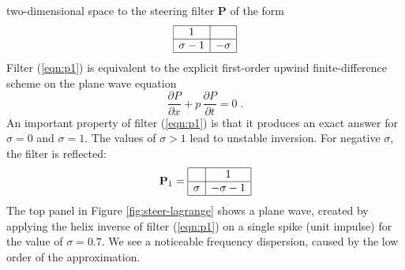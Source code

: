 two-dimensional space to the steering filter $\mathbf{P}$ of the
form
\begin{equation}
  \label{eqn:p1}
  \begin{array}{|c|c|}
    \hline
    1 & \\ \hline
    \sigma-1 & -\sigma \\ \hline
  \end{array}
\end{equation}
Filter (\ref{eqn:p1}) is equivalent to the explicit first-order upwind
finite-difference scheme on the plane wave equation
\begin{equation}
  \label{eqn:wave}
  \frac{\partial P}{\partial x} + p\,\frac{\partial P}{\partial t} = 0\;.
\end{equation}
An important property of filter (\ref{eqn:p1}) is that it produces an
exact answer for $\sigma=0$ and $\sigma=1$. The values of $\sigma > 1$
lead to unstable inversion. For negative $\sigma$, the filter is 
reflected:
\begin{equation}
  \label{eqn:p1p}
  \mathbf{P}_1 =
  \begin{array}{|c|c|}
    \hline
     & 1 \\ \hline
    \sigma & -\sigma - 1 \\ \hline
  \end{array}
\end{equation}
The top panel in Figure \ref{fig:steer-lagrange} shows a plane wave, created
by applying the helix inverse of filter (\ref{eqn:p1}) on a single
spike (unit impulse) for the value of $\sigma=0.7$. We see a
noticeable frequency dispersion, caused by the low order of the
approximation.

